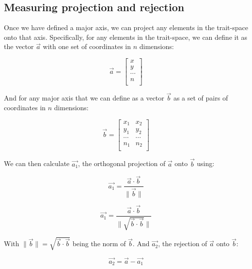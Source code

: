 \documentclass[12pt,a4paper]{article}
\begin{document}
\subsection{Measuring projection and rejection}

Once we have defined a major axis, we can project any elements in the trait-space onto that axis.
Specifically, for any elements in the trait-space, we can define it as the vector $\vec{a}$ with one set of coordinates in $n$ dimensions:

\begin{equation}
    \vec{a} = 
    \begin{bmatrix}
    x \\
    y \\
    \cdots \\
    n \\
    \end{bmatrix}
\end{equation}

And for any major axis that we can define as a vector $\vec{b}$ as a set of pairs of coordinates in $n$ dimensions:

\begin{equation}
    \vec{b} = 
    \begin{bmatrix}
    x_{1} & x_{2} \\
    y_{1} & y_{2} \\
    \cdots & \cdots \\
    n_{1} & n_{2} \\
    \end{bmatrix}
\end{equation}

We can then calculate $\vec{a_{1}}$, the orthogonal projection of $\vec{a}$ onto $\vec{b}$ using:

\begin{equation}
    \vec{a_{1}} = \frac{\vec{a} \cdot \vec{b}}{\|\vec{b}\|}
\end{equation}


\begin{equation}
    \vec{a_{1}} = \frac{\vec{a} \cdot \vec{b}}{\|\sqrt{\vec{b} \cdot \vec{b}}\|}
\end{equation}


With $\|\vec{b}\| = \sqrt{\vec{b} \cdot \vec{b}}$ being the norm of $\vec{b}$.
And $\vec{a_{2}}$, the rejection of $\vec{a}$ onto $\vec{b}$:

\begin{equation}
    \vec{a_{2}} = \vec{a} - \vec{a_{1}}
\end{equation}
\end{document}
